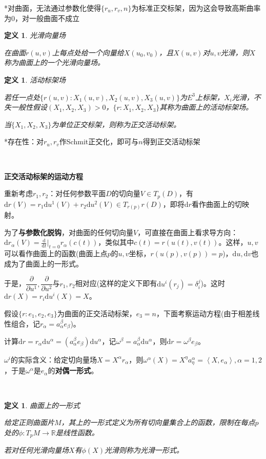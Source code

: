 \documentclass[a4paper,UTF8,fontset=windows]{ctexart}
\newtheorem{dfn}[thm]{定义}
\begin{document}
*对曲面，无法通过参数化使得$\{r_u,r_v,n\}$为标准正交标架，因为这会导致高斯曲率为0，对一般曲面不成立

\begin{dfn} 光滑向量场

在曲面$r(u,v)$上每点处给一个向量给$X(u_0,v_0)$，且$X(u,v)$对$u,v$光滑，则$X$称为曲面上的一个光滑向量场。
\end{dfn}

\begin{dfn} 活动标架场

若任一点处$\{r(u,v):X_1(u,v),X_2(u,v),X_3(u,v)\}$为$E^3$上标架，$X_i$光滑，不失一般性假设$(X_1,X_2,X_3)>0$，$\{r:X_1,X_2,X_3\}$其称为曲面上的活动标架场。

当$\{X_1,X_2,X_3\}$为单位正交标架，则称为正交活动标架。
\end{dfn}

*存在性：对$r_u,r_v$作Schmit正交化，即可与$n$得到正交活动标架

\

\textbf{正交活动标架的运动方程}

重新考虑$r_1,r_2$：对任何参数平面$D$的切向量$V\in T_p(D)$，有$\mathrm{d}r(V)=r_1\mathrm{d}u^1(V)+r_2\mathrm{d}u^2(V)\in T_{r(p)}r(D)$，即将$\mathrm{d}r$看作曲面上的切映射。

为了\textbf{与参数化脱钩}，对曲面的任何切向量$V$，可直接在曲面上看求导方向：$\mathrm{d}r_\alpha(V)=\frac{\mathrm{d}}{\mathrm{d}t}\big|_{t=0}r_\alpha(c(t))$，类似其中$c(t)=r(u(t),v(t))$。这样，$u,v$可以看作曲面上的函数(曲面上点$p$的$u,v$坐标，$r(u(p),v(p))=p$)，$\mathrm{d}u,\mathrm{d}v$也成为了曲面上的一形式。

于是，$\dfrac{\partial}{\partial u^1},\dfrac{\partial}{\partial u^2}$与$r_1,r_2$相对应(这样的定义下即有$\mathrm{d}u^i(r_j)=\delta_i^j$)。这时$\mathrm{d}r(X)=r_i\mathrm{d}u^i(X)=X$。

假设$\{r:e_1,e_2,e_3\}$为曲面的正交活动标架，$e_3=n$，下面考察运动方程(由于相差线性组合，记$r_\alpha=a_\alpha^\beta e_\beta$)。

计算$\mathrm{d}r=r_\alpha\mathrm{d}u^\alpha=(a_\alpha^\beta e_\beta)\mathrm{d}u^\alpha$，记$\omega^\beta=a_\alpha^\beta\mathrm{d}u^\alpha$，则$\mathrm{d}r=\omega^\beta e_\beta$。

$\omega^i$的实际含义：给定切向量场$X=X^\alpha r_\alpha$，则$\omega^\alpha(X)=X^\eta a_\eta^\alpha=\left<X,e_\alpha\right>,\alpha=1,2$，于是$\omega^\alpha$是$e_\alpha$的\textbf{对偶一形式}。

\

\begin{dfn} 曲面上的一形式

给定正则曲面片$M$，其上的一形式定义为所有切向量集合上的函数，限制在每点$p$处的$\phi:T_pM\to\mathbb{R}$是线性函数。

若对任何光滑向量场$X$有$\phi(X)$光滑则称为光滑一形式。
\end{dfn}
\end{document}
